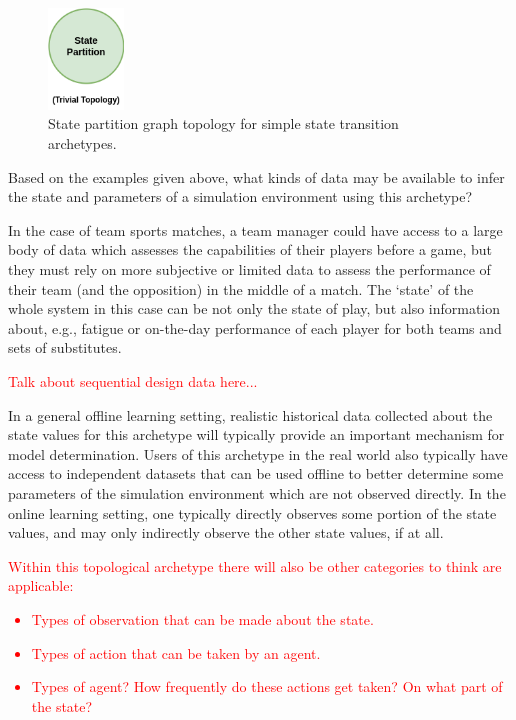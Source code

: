\begin{figure}[h]
\centering
\includegraphics[width=2cm]{images/chapter-6-state-partition-graph.drawio.png}
\caption{State partition graph topology for simple state transition archetypes.}
\label{fig:state-partition-graph-simple-state-transitions}
\end{figure}

Based on the examples given above, what kinds of data may be available to infer the state and parameters of a simulation environment using this archetype? 

In the case of team sports matches, a team manager could have access to a large body of data which assesses the capabilities of their players before a game, but they must rely on more subjective or limited data to assess the performance of their team (and the opposition) in the middle of a match. The `state' of the whole system in this case can be not only the state of play, but also information about, e.g., fatigue or on-the-day performance of each player for both teams and sets of substitutes. 

\textcolor{red}{Talk about sequential design data here...}

In a general offline learning setting, realistic historical data collected about the state values for this archetype will typically provide an important mechanism for model determination. Users of this archetype in the real world also typically have access to independent datasets that can be used offline to better determine some parameters of the simulation environment which are not observed directly. In the online learning setting, one typically directly observes some portion of the state values, and may only indirectly observe the other state values, if at all.

\textcolor{red}{Within this topological archetype there will also be other categories to think are applicable:
\begin{itemize}
\item{Types of observation that can be made about the state.}
\item{Types of action that can be taken by an agent.}
\item{Types of agent? How frequently do these actions get taken? On what part of the state?}
\end{itemize}
}


